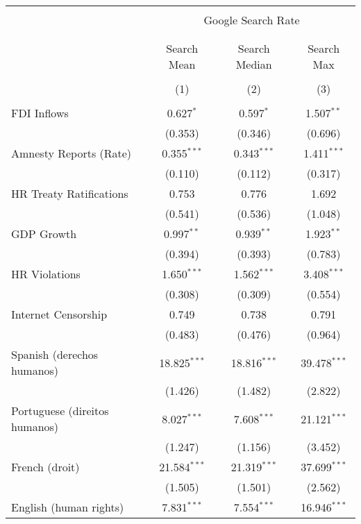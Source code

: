 
\begin{table}[!htbp] \centering 
  \caption{} 
  \label{} 
\begin{tabular}{@{\extracolsep{5pt}}lccc} 
\\[-1.8ex]\hline 
\hline \\[-1.8ex] 
 & \multicolumn{3}{c}{Google Search Rate} \\ 
\cline{2-4} 
\\[-1.8ex] & \multicolumn{3}{c}{ } \\ 
 & Search Mean & Search Median & Search Max \\ 
\\[-1.8ex] & (1) & (2) & (3)\\ 
\hline \\[-1.8ex] 
 FDI Inflows & 0.627$^{*}$ & 0.597$^{*}$ & 1.507$^{**}$ \\ 
  & (0.353) & (0.346) & (0.696) \\ 
  Amnesty Reports (Rate) & 0.355$^{***}$ & 0.343$^{***}$ & 1.411$^{***}$ \\ 
  & (0.110) & (0.112) & (0.317) \\ 
  HR Treaty Ratifications & 0.753 & 0.776 & 1.692 \\ 
  & (0.541) & (0.536) & (1.048) \\ 
  GDP Growth & 0.997$^{**}$ & 0.939$^{**}$ & 1.923$^{**}$ \\ 
  & (0.394) & (0.393) & (0.783) \\ 
  HR Violations & 1.650$^{***}$ & 1.562$^{***}$ & 3.408$^{***}$ \\ 
  & (0.308) & (0.309) & (0.554) \\ 
  Internet Censorship & 0.749 & 0.738 & 0.791 \\ 
  & (0.483) & (0.476) & (0.964) \\ 
  Spanish (derechos humanos) & 18.825$^{***}$ & 18.816$^{***}$ & 39.478$^{***}$ \\ 
  & (1.426) & (1.482) & (2.822) \\ 
  Portuguese (direitos humanos) & 8.027$^{***}$ & 7.608$^{***}$ & 21.121$^{***}$ \\ 
  & (1.247) & (1.156) & (3.452) \\ 
  French (droit) & 21.584$^{***}$ & 21.319$^{***}$ & 37.699$^{***}$ \\ 
  & (1.505) & (1.501) & (2.562) \\ 
  English (human rights) & 7.831$^{***}$ & 7.554$^{***}$ & 16.946$^{***}$ \\ 

\end{tabular}
\end{table}
